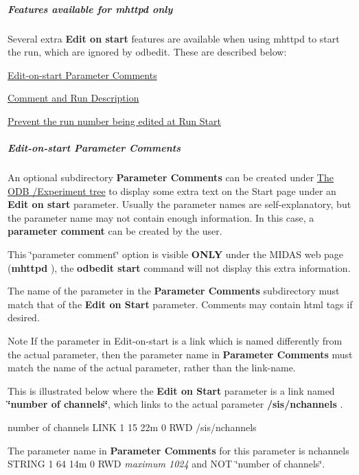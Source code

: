 \par


\par
\hypertarget{RC_mhttpd_Start_page_RC_EOS_web_features}{}\subparagraph{Features available for mhttpd only}\label{RC_mhttpd_Start_page_RC_EOS_web_features}
Several extra {\bfseries Edit on start} features are available when using mhttpd to start the run, which are ignored by odbedit. These are described below:


\begin{DoxyItemize}
\item \hyperlink{RC_mhttpd_Start_page_RC_Edit_PC}{Edit-\/on-\/start Parameter Comments}
\item \hyperlink{RC_mhttpd_status_page_features_RC_Edit_RP}{Comment and Run Description}
\item \hyperlink{RC_mhttpd_Start_page_RC_Prevent_Edit_RN}{Prevent the run number being edited at Run Start}
\end{DoxyItemize}

\par


\par
\hypertarget{RC_mhttpd_Start_page_RC_Edit_PC}{}\subparagraph{Edit-\/on-\/start Parameter Comments}\label{RC_mhttpd_Start_page_RC_Edit_PC}
An optional subdirectory {\bfseries Parameter Comments} can be created under \hyperlink{RC_customize_ODB_RC_ODB_Experiment_Tree}{The ODB /Experiment tree} to display some extra text on the Start page under an {\bfseries Edit on start} parameter. Usually the parameter names are self-\/explanatory, but the parameter name may not contain enough information. In this case, a {\bfseries parameter comment} can be created by the user.

This \char`\"{}parameter comment\char`\"{} option is visible {\bfseries ONLY} under the MIDAS web page ({\bfseries mhttpd} ), the {\bfseries  odbedit start } command will not display this extra information.

The name of the parameter in the {\bfseries Parameter Comments} subdirectory must match that of the {\bfseries Edit on Start} parameter. Comments may contain html tags if desired. \par
 \begin{DoxyNote}{Note}
If the parameter in Edit-\/on-\/start is a link which is named differently from the actual parameter, then the parameter name in {\bfseries Parameter Comments} must match the name of the actual parameter, rather than the link-\/name.
\end{DoxyNote}
This is illustrated below where the {\bfseries Edit on Start} parameter is a link named {\bfseries \char`\"{}number of channels\char`\"{}}, which links to the actual parameter {\bfseries  /sis/nchannels }. 
\begin{DoxyCode}
number of channels              LINK    1     15    22m  0   RWD  /sis/nchannels
\end{DoxyCode}
 The parameter name in {\bfseries Parameter Comments } for this parameter is nchannels STRING 1 64 14m 0 RWD {\itshape maximum 1024\/} and NOT \char`\"{}number of channels\char`\"{}.


